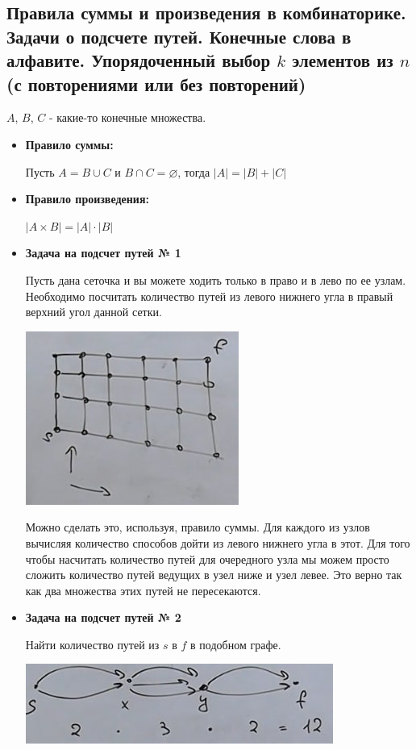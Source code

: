 \subsection{Правила суммы и произведения в комбинаторике. Задачи о подсчете путей. Конечные слова в алфавите. Упорядоченный выбор $k$ элементов из $n$ (с повторениями или без повторений)}

$A$, $B$, $C$ - какие-то конечные множества.
\begin{itemize}
\item \textbf{Правило суммы:}

Пусть $A = B \cup C$ и $B \cap C = \varnothing$, тогда $|A| = |B| + |C|$

\item \textbf{Правило произведения:}

$|A \times B| = |A| \cdot |B|$

\item \textbf{Задача на подсчет путей № 1}

Пусть дана сеточка и вы можете ходить только в право и в лево по ее узлам. Необходимо посчитать количество путей из левого нижнего угла в правый верхний угол данной сетки.

\includegraphics[scale=1.5]{definitions/images/first-patch.jpg}

Можно сделать это, используя, правило суммы. Для каждого из узлов вычисляя количество способов дойти из левого нижнего угла в этот. Для того чтобы насчитать количество путей для очередного узла мы можем просто сложить количество путей ведущих в узел ниже и узел левее. Это верно так как два множества этих путей не пересекаются.

\item \textbf{Задача на подсчет путей № 2}

Найти количество путей из $s$ в $f$ в подобном графе.

\includegraphics[scale=1.5]{definitions/images/second-patch.jpg}


\end{itemize}
